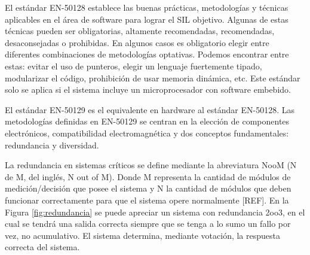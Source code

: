     \begin{table}[!h]
        {
        \caption{Asignación del SIL en función de la Probabilidad de Fallas por Hora (PFH).}
        \label{Tab:tabla_SIL}
        \centering
            \begin{center}
            \end{center}
        }    
    \end{table}

    El estándar EN-50128 establece las buenas prácticas, metodologías y técnicas aplicables en el área de software para lograr el SIL objetivo. Algunas de estas técnicas pueden ser obligatorias, altamente recomendadas, recomendadas, desaconsejadas o prohibidas. En algunos casos es obligatorio elegir entre diferentes combinaciones de metodologías optativas. Podemos encontrar entre estas: evitar el uso de punteros, elegir un lenguaje fuertemente tipado, modularizar el código, prohibición de usar memoria dinámica, etc. Este estándar solo se aplica si el sistema incluye un microprocesador con software embebido.

    El estándar EN-50129 es el equivalente en hardware al estándar EN-50128. Las metodologías definidas en EN-50129 se centran en la elección de componentes electrónicos, compatibilidad electromagnética y dos conceptos fundamentales: redundancia y diversidad.

    La redundancia en sistemas críticos se define mediante la abreviatura NooM (N de M, del inglés, N out of M). Donde M representa la cantidad de módulos de medición/decisión que posee el sistema y N la cantidad de módulos que deben funcionar correctamente para que el sistema opere normalmente [REF]. En la Figura \ref{fig:redundancia} se puede apreciar un sistema con redundancia 2oo3, en el cual se tendrá una salida correcta siempre que se tenga a lo sumo un fallo por vez, no acumulativo. El sistema determina, mediante votación, la respuesta correcta del sistema.

